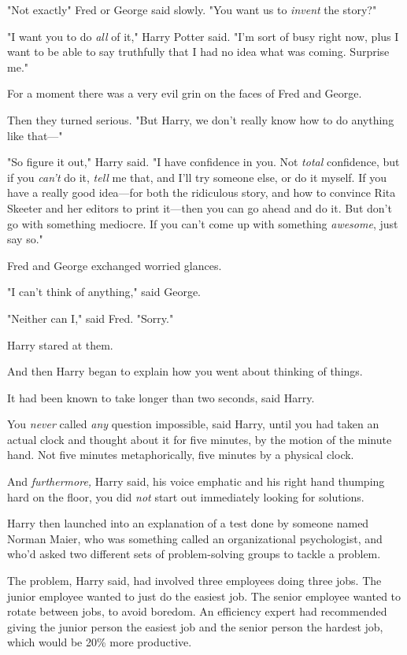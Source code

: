 "Not exactly{\el}" Fred or George said slowly. "You want us to \emph{invent}
the story?"

"I want you to do \emph{all} of it," Harry Potter said. "I'm sort of busy right
now, plus I want to be able to say truthfully that I had no idea what was
coming. Surprise me."

For a moment there was a very evil grin on the faces of Fred and George.

Then they turned serious. "But Harry, we don't really know how to do anything
like that\mbox{---}"

"So figure it out," Harry said. "I have confidence in you. Not \emph{total}
confidence, but if you \emph{can't} do it, \emph{tell} me that, and I'll try
someone else, or do it myself. If you have a really good idea---for both the
ridiculous story, and how to convince Rita Skeeter and her editors to print
it---then you can go ahead and do it. But don't go with something mediocre. If
you can't come up with something \emph{awesome}, just say so."

Fred and George exchanged worried glances.

"I can't think of anything," said George.

"Neither can I," said Fred. "Sorry."

Harry stared at them.

And then Harry began to explain how you went about thinking of things.

It had been known to take longer than two seconds, said Harry.

You \emph{never} called \emph{any} question impossible, said Harry, until you
had taken an actual clock and thought about it for five minutes, by the motion
of the minute hand. Not five minutes metaphorically, five minutes by a physical
clock.

And \emph{furthermore,} Harry said, his voice emphatic and his right hand
thumping hard on the floor, you did \emph{not} start out immediately looking
for solutions.

Harry then launched into an explanation of a test done by someone named Norman
Maier, who was something called an organizational psychologist, and who'd asked
two different sets of problem-solving groups to tackle a problem.

The problem, Harry said, had involved three employees doing three jobs. The
junior employee wanted to just do the easiest job. The senior employee wanted
to rotate between jobs, to avoid boredom. An efficiency expert had recommended
giving the junior person the easiest job and the senior person the hardest job,
which would be 20\% more productive.

